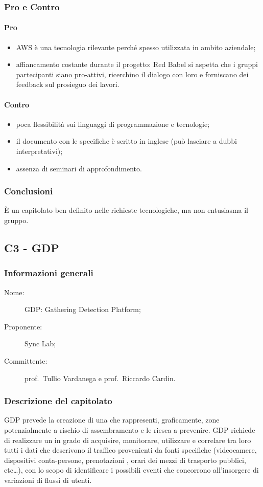 \subsubsection{Pro e Contro}
\paragraph*{Pro}
\begin{itemize}
	\item AWS è una tecnologia rilevante perché spesso utilizzata in ambito aziendale;
	\item affiancamento costante durante il progetto: Red Babel si aspetta che i gruppi partecipanti siano pro-attivi, ricerchino il dialogo con loro e forniscano dei feedback sul prosieguo dei lavori.
\end{itemize}
\paragraph*{Contro}
\begin{itemize}
	\item poca flessibilità sui linguaggi di programmazione e tecnologie;
	\item il documento con le specifiche è scritto in inglese (può lasciare a dubbi interpretativi);
	\item assenza di seminari di approfondimento.
\end{itemize}
\subsubsection{Conclusioni}
È un capitolato ben definito nelle richieste tecnologiche, ma non entusiasma il gruppo.

\subsection{C3 - GDP}
\subsubsection{Informazioni generali}
\begin{description}
	\item[Nome:] GDP: Gathering Detection Platform;
	\item[Proponente:] Sync Lab;
	\item[Committente:] prof.~Tullio Vardanega e prof.~Riccardo Cardin.
\end{description}
\subsubsection{Descrizione del capitolato}
GDP prevede la creazione di una  che rappresenti, graficamente, zone potenzialmente a rischio di assembramento e le riesca a prevenire. GDP richiede di realizzare un  in grado di acquisire, monitorare, utilizzare e correlare tra loro tutti i dati che descrivono il traffico provenienti da fonti specifiche (videocamere, dispositivi conta-persone, prenotazioni , orari dei mezzi di trasporto pubblici, etc\dots), con lo scopo di identificare i possibili eventi che concorrono all'insorgere di variazioni di flussi di utenti.
